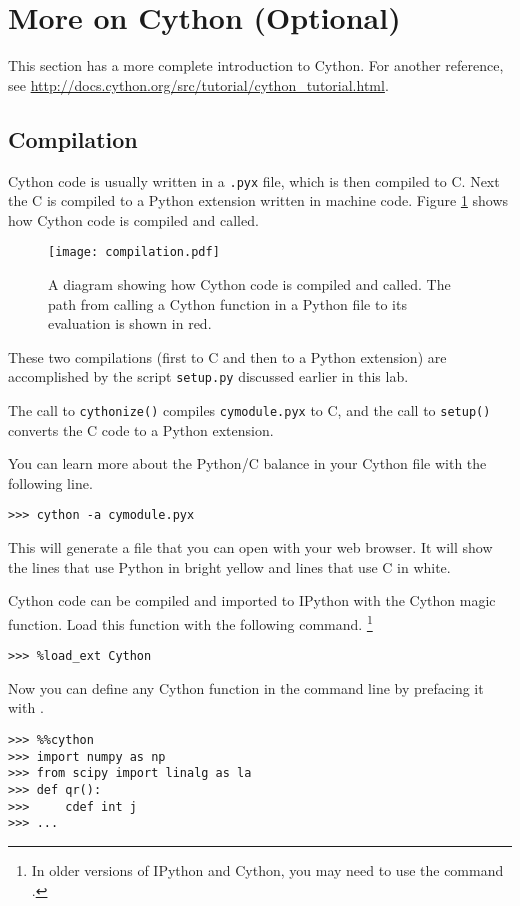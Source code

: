       
\section*{More on Cython (Optional)}
This section has a more complete introduction to Cython. 
For another reference, see \url{http://docs.cython.org/src/tutorial/cython_tutorial.html}.

\subsection*{Compilation}

Cython code is usually written in a \texttt{.pyx} file, which is then compiled to C.
Next the C is compiled to a Python extension written in machine code.
Figure \ref{cython:compilation} shows how Cython code is compiled and called.

\begin{figure}
\centering
\texttt{[image: compilation.pdf]}
\caption{A diagram showing how Cython code is compiled and called.
The path from calling a Cython function in a Python file to its evaluation is shown in red.}
\label{cython:compilation}
\end{figure}

These two compilations (first to C and then to a Python extension) are accomplished by the script \texttt{setup.py} discussed earlier in this lab.

The call to \texttt{cythonize()} compiles \texttt{cymodule.pyx} to C, and the call to \texttt{setup()} converts the C code to a Python extension.

\begin{info}
You can learn more about the Python/C balance in your Cython file with the following line.
\begin{lstlisting}
>>> cython -a cymodule.pyx
\end{lstlisting}
This will generate a  file that you can open with your web browser.
It will show the lines that use Python in bright yellow and lines that use C in white.
\end{info}

Cython code can be compiled and imported to IPython with the Cython magic function.
Load this function with the following command.
\footnote{In older versions of IPython and Cython, you may need to use the command .}
\begin{lstlisting}
>>> %load_ext Cython
\end{lstlisting}
Now you can define any Cython function in the command line by prefacing it with .
\begin{lstlisting}
>>> %%cython
>>> import numpy as np
>>> from scipy import linalg as la
>>> def qr():
>>>     cdef int j
>>> ...
\end{lstlisting}

